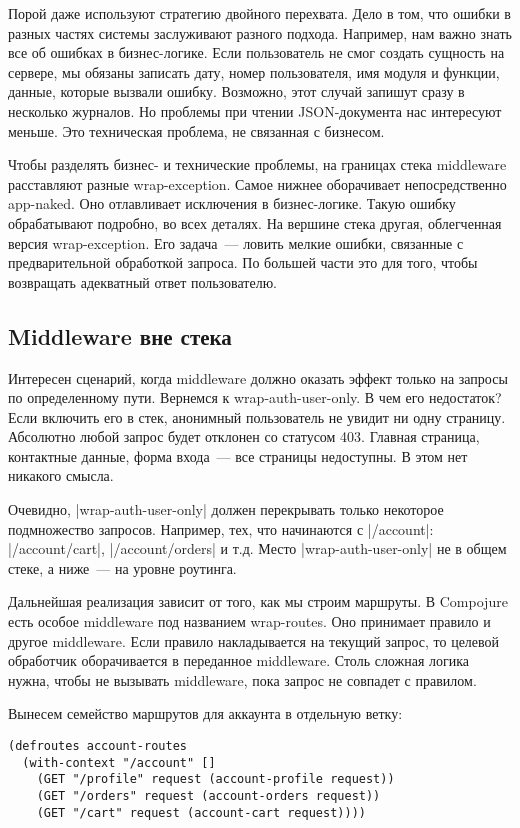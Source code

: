 Порой даже используют стратегию двойного перехвата. Дело в том, что ошибки в
разных частях системы заслуживают разного подхода. Например, нам важно знать все
об ошибках в бизнес-логике. Если пользователь не смог создать сущность на
сервере, мы обязаны записать дату, номер пользователя, имя модуля и функции,
данные, которые вызвали ошибку. Возможно, этот случай запишут сразу в несколько
журналов. Но проблемы при чтении JSON-документа нас интересуют меньше. Это
техническая проблема, не связанная с бизнесом.

Чтобы разделять бизнес- и технические проблемы, на границах стека middleware
расставляют разные wrap-exception. Самое нижнее оборачивает непосредственно
app-naked. Оно отлавливает исключения в бизнес-логике. Такую ошибку обрабатывают
подробно, во всех деталях. На вершине стека другая, облегченная версия
wrap-exception. Его задача~--- ловить мелкие ошибки, связанные с предварительной
обработкой запроса. По большей части это для того, чтобы возвращать адекватный
ответ пользователю.

\subsection{Middleware вне стека}

Интересен сценарий, когда middleware должно оказать эффект только на запросы по
определенному пути. Вернемся к wrap-auth-user-only. В чем его недостаток? Если
включить его в стек, анонимный пользователь не увидит ни одну
страницу. Абсолютно любой запрос будет отклонен со статусом 403. Главная
страница, контактные данные, форма входа~--- все страницы недоступны. В этом нет
никакого смысла.

Очевидно, \spverb|wrap-auth-user-only| должен перекрывать только некоторое подмножество
запросов. Например, тех, что начинаются с \spverb|/account|: \spverb|/account/cart|,
\spverb|/account/orders| и т.д. Место \spverb|wrap-auth-user-only| не в общем стеке, а ниже~---
на уровне роутинга.

Дальнейшая реализация зависит от того, как мы строим маршруты. В Compojure есть
особое middleware под названием wrap-routes. Оно принимает правило и другое
middleware. Если правило накладывается на текущий запрос, то целевой обработчик
оборачивается в переданное middleware. Столь сложная логика нужна, чтобы не
вызывать middleware, пока запрос не совпадет с правилом.

Вынесем семейство маршрутов для аккаунта в отдельную ветку:

\begin{verbatim}
(defroutes account-routes
  (with-context "/account" []
    (GET "/profile" request (account-profile request))
    (GET "/orders" request (account-orders request))
    (GET "/cart" request (account-cart request))))
\end{verbatim}

